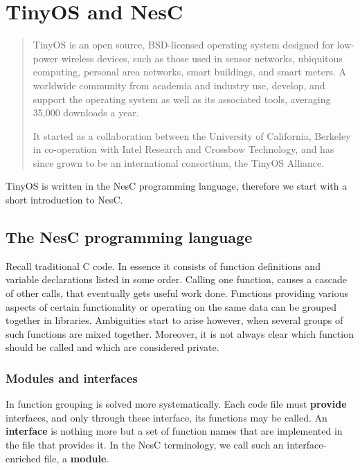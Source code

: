 \chapter{TinyOS and NesC}

\begin{quotation}
TinyOS is an open source, BSD-licensed operating system designed for low-power wireless devices, such as those used in sensor networks, ubiquitous computing, personal area networks, smart buildings, and smart meters. A worldwide community from academia and industry use, develop, and support the operating system as well as its associated tools, averaging 35,000 downloads a year.

It started as a collaboration between the University of California, Berkeley in co-operation with Intel Research and Crossbow Technology, and has since grown to be an international consortium, the TinyOS Alliance.

{\hfill \cite{TOSnet,TOSw}}
\end{quotation}

TinyOS is written in the NesC programming language, therefore we start with a short introduction to NesC.

\section{The NesC programming language}

Recall traditional C code. In essence it consists of function definitions and variable declarations listed in some order. Calling one function, causes a cascade of other calls, that eventually gets useful work done. Functions providing various aspects of certain functionality or operating on the same data can be grouped together in libraries. Ambiguities start to arise however, when several groups of such functions are mixed together. Moreover, it is not always clear which function should be called and which are considered private.

\subsection{Modules and interfaces}

In \cite{NesC} function grouping is solved more systematically. Each code file must {\bf provide} interfaces, and only through these interface, its functions may be called. An {\bf interface} is nothing more but a set of function names that are implemented in the file that provides it. In the NesC terminology, we call such an interface-enriched file, a {\bf module}.

